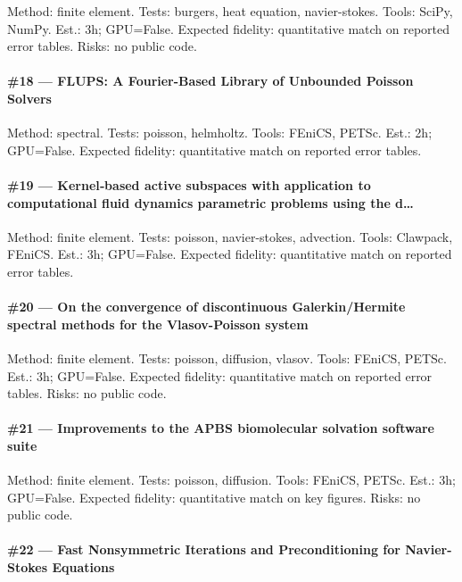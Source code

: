 \documentclass[10pt,letterpaper]{article}
\begin{document}
Method: finite element. Tests: burgers, heat equation, navier-stokes. Tools: SciPy, NumPy. Est.: 3h; GPU=False. Expected fidelity: quantitative match on reported error tables. Risks: no public code.

\paragraph{\#18 — FLUPS: A Fourier-Based Library of Unbounded Poisson Solvers}

Method: spectral. Tests: poisson, helmholtz. Tools: FEniCS, PETSc. Est.: 2h; GPU=False. Expected fidelity: quantitative match on reported error tables. 

\paragraph{\#19 — Kernel‐based active subspaces with application to computational fluid dynamics parametric problems using the d…}

Method: finite element. Tests: poisson, navier-stokes, advection. Tools: Clawpack, FEniCS. Est.: 3h; GPU=False. Expected fidelity: quantitative match on reported error tables. 

\paragraph{\#20 — On the convergence of discontinuous Galerkin/Hermite spectral methods for the Vlasov-Poisson system}

Method: finite element. Tests: poisson, diffusion, vlasov. Tools: FEniCS, PETSc. Est.: 3h; GPU=False. Expected fidelity: quantitative match on reported error tables. Risks: no public code.

\paragraph{\#21 — Improvements to the APBS biomolecular solvation software suite}

Method: finite element. Tests: poisson, diffusion. Tools: FEniCS, PETSc. Est.: 3h; GPU=False. Expected fidelity: quantitative match on key figures. Risks: no public code.

\paragraph{\#22 — Fast Nonsymmetric Iterations and Preconditioning for Navier-Stokes Equations}
\end{document}
